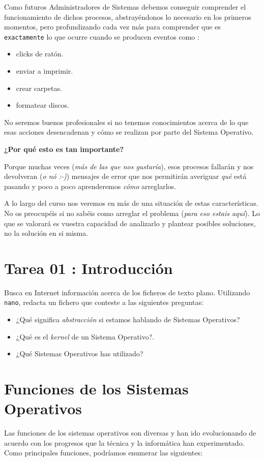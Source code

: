\documentclass[11pt]{article}
\begin{document}
Como futuros Administradores de Sistemas debemos conseguir comprender el funcionamiento de dichos
procesos, abstrayéndonos lo necesario en los primeros momentos, pero profundizando cada vez más 
para comprender que es \texttt{exactamente} lo que ocurre cuando se producen eventos como :

\begin{itemize}
\item clicks de ratón.
\item enviar a imprimir.
\item crear carpetas.
\item formatear discos.
\end{itemize}

No seremos buenos profesionales si no tenemos conocimientos acerca de lo que esas acciones desencadenan 
y cómo se realizan por parte del Sistema Operativo. 

\textbf{¿Por qué esto es tan importante?}

Porque muchas veces (\emph{más de las que nos gustaría}), esos procesos fallarán y nos devolveran (\emph{o nó :-)})
mensajes de error que nos permitirán averiguar \emph{qué} está pasando y poco a poco aprenderemos \emph{cómo} arreglarlos.

A lo largo del curso nos veremos en más de una situación de estas características. No os preocupéis si no 
sabéis como arreglar el problema (\emph{para eso estais aquí}). Lo que se valorará es vuestra capacidad de analizarlo
y plantear posibles soluciones, no la solución en si misma.

\newpage
\section{Tarea 01 : Introducción}
\label{sec:orgcfd4b56}

Busca en Internet información acerca de los ficheros de texto plano.
Utilizando \texttt{nano}, redacta un fichero que conteste a las siguientes preguntas:

\begin{itemize}
\item ¿Qué significa \emph{abstracción} si estamos hablando de Sistemas Operativos?
\item ¿Qué es el \emph{kernel} de un Sistema Operativo?.
\item ¿Qué Sistemas Operativos has utilizado?
\end{itemize}


\newpage
\section{Funciones de los Sistemas Operativos}
\label{sec:org394cd08}
Las funciones de los sistemas operativos son diversas y han ido
evolucionando de acuerdo con los progresos que la técnica y la
informática han experimentado. Como principales funciones, podríamos
enumerar las siguientes:
\end{document}
